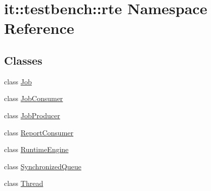 \hypertarget{namespaceit_1_1testbench_1_1rte}{\section{it\-:\-:testbench\-:\-:rte Namespace Reference}
\label{d9/d7b/namespaceit_1_1testbench_1_1rte}
}
\subsection*{Classes}
\begin{DoxyCompactItemize}
\item 
class \hyperlink{classit_1_1testbench_1_1rte_1_1Job}{Job}
\item 
class \hyperlink{classit_1_1testbench_1_1rte_1_1JobConsumer}{Job\-Consumer}
\item 
class \hyperlink{classit_1_1testbench_1_1rte_1_1JobProducer}{Job\-Producer}
\item 
class \hyperlink{classit_1_1testbench_1_1rte_1_1ReportConsumer}{Report\-Consumer}
\item 
class \hyperlink{classit_1_1testbench_1_1rte_1_1RuntimeEngine}{Runtime\-Engine}
\item 
class \hyperlink{classit_1_1testbench_1_1rte_1_1SynchronizedQueue}{Synchronized\-Queue}
\item 
class \hyperlink{classit_1_1testbench_1_1rte_1_1Thread}{Thread}
\end{DoxyCompactItemize}
